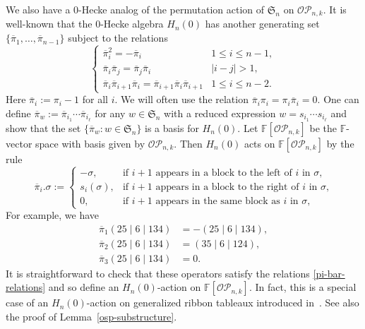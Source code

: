 \documentclass[10pt]{amsart}
\theoremstyle{definition}
\newcommand{\symm}{{\mathfrak{S}}}
\newcommand{\OP}{{\mathcal{OP}}}
\newcommand{\FF}{{\mathbb{F}}}
\newcommand{\pib}{\overline{\pi}}
\begin{document}
We also have a 0-Hecke analog of the permutation action of $\symm_n$ on $\OP_{n,k}$.
It is well-known that the 0-Hecke algebra $H_n(0)$ has another generating set $\{\pib_1,\ldots,\pib_{n-1}\}$ subject to the relations
\begin{equation}\label{pi-bar-relations}
\begin{cases}
\pib_i^2 =  -\pib_i & 1 \leq i \leq n-1, \\
\pib_i \pib_j = \pib_j \pib_i & |i - j| > 1,  \\
\pib_i \pib_{i+1} \pib_i = \pib_{i+1} \pib_i \pib_{i+1} & 1 \leq i \leq n-2.
\end{cases}
\end{equation}
Here $\pib_i:=\pi_i-1$ for all $i$.
We will often use the relation $\pib_i\pi_i = \pi_i\pib_i=0$.
One can define $\pib_w:=\pib_{i_1}\cdots\pib_{i_\ell}$ for any $w\in\symm_n$ with a reduced expression $w=s_{i_1}\cdots s_{i_\ell}$ and show that the set $\{\pib_w:w\in\symm_n\}$ is a basis for $H_n(0)$.
Let $\FF[\OP_{n,k}]$ be the $\FF$-vector space with basis given by $\OP_{n,k}$.
Then $H_n(0)$ acts on $\FF[\OP_{n,k}]$ by the rule
\begin{equation}
\label{pi-defining-action}
\pib_i . \sigma := \begin{cases}
-\sigma, & \text{if $i+1$ appears in a block to the left of $i$ in $\sigma$,} \\
s_i(\sigma), & \text{if $i+1$ appears in a block to the right of $i$ in $\sigma$,} \\
0, & \text{if $i+1$ appears in the same block as $i$ in $\sigma$,} 
\end{cases}
\end{equation}
For example, we have
\begin{align*}
\pib_1 (25 \mid 6 \mid 134) &= -(25 \mid 6 \mid 134),  \\
\pib_2 (25 \mid 6 \mid 134) &= (35 \mid 6 \mid 124), \\
\pib_3 (25 \mid 6 \mid 134) &= 0.
\end{align*}
It is straightforward to check that these operators satisfy the relations \eqref{pi-bar-relations}
and so define an $H_n(0)$-action on $\FF[\OP_{n,k}]$. 
In fact, this is a special case of an $H_n(0)$-action on generalized ribbon tableaux introduced in~\cite{HuangTab}.
See also the proof of Lemma~\ref{osp-substructure}.
\end{document}

